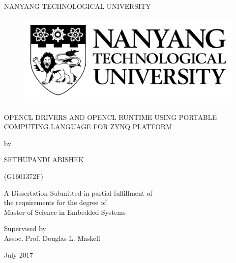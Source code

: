 \begin{titlepage}
\begin{center}
{\LARGE {NANYANG TECHNOLOGICAL UNIVERSITY}}
\begin{figure}[!t]
\centering
\includegraphics[width= 8 cm]{figures/NTU_logo.pdf}
\end{figure} 
\vspace*{0.7in}
{\large OPENCL DRIVERS AND OPENCL RUNTIME USING PORTABLE COMPUTING LANGUAGE FOR ZYNQ PLATFORM}
\par
\vspace{0.4 in}
{\large by\\}
\vspace{0.2 in}
{\large SETHUPANDI ABISHEK

(G1601372F)}
\vspace{0.1 in}
\par
\vfill
A Dissertation Submitted in partial fulfillment of \\ the requirements for the degree of \\ Master of Science in Embedded Systems
\par
\vspace{0.4in}
Supervised by\\
\vspace{0.1in}
{\large Assoc. Prof. Douglas L. Maskell \\}
\par
\vspace{0.15in}
July 2017
\end{center}
\end{titlepage}